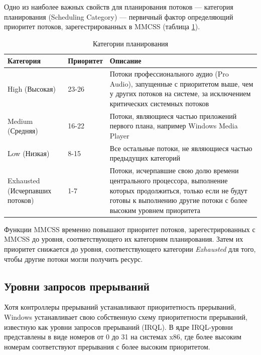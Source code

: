 Одно из наиболее важных свойств для планирования потоков --- категория планирования (Scheduling Category) --- первичный фактор определяющий приоритет потоков, зарегестрированных в MMCSS (таблица \ref{tab:category}).

\begin{table}[H]
    \caption{Категории планирования}
    \begin{center}
        \begin{tabular}{|p{40mm}|p{30mm}|p{80mm}|}
            \hline
            \textbf{Категория} & \textbf{Приоритет} & \textbf{Описание} \\
            \hline
            High (Высокая) & 23-26 & Потоки профессионального аудио (Pro
Audio), запущенные с приоритетом выше, чем у других потоков на системе, за
исключением критических системных потоков \\
            \hline
            Medium (Средняя) & 16-22 & Потоки, являющиеся частью приложений
первого плана, например Windows Media Player \\
            \hline
            Low (Низкая) & 8-15 & Все остальные потоки, не являющиеся частью
предыдущих категорий \\
            \hline
            Exhausted (Исчерпавших потоков) & 1-7 & Потоки, исчерпавшие свою
долю времени центрального процессора, выполнение которых продолжиться, только
если не будут готовы к выполнению другие потоки с более высоким уровнем
приоритета \\
            \hline
        \end{tabular}
    \end{center}
    \label{tab:category}
\end{table}

Функции MMCSS временно повышают приоритет потоков, зарегестрированных с MMCSS до уровня, соответствующего их категориям планирования. Затем их приоритет снижается до уровня, соответствующего категории \textit{Exhausted} для того, чтобы другие потоки могли получить ресурс.

\subsection{Уровни запросов прерываний}

Хотя контроллеры прерываний устанавливают приоритетность прерываний,
Windows устанавливает свою собственную схему приоритетности прерываний, известную как уровни запросов прерываний (IRQL). В ядре IRQL-уровни представлены в виде номеров от 0 до 31 на системах x86, где более высоким номерам соответствуют прерывания с более высоким приоритетом.

